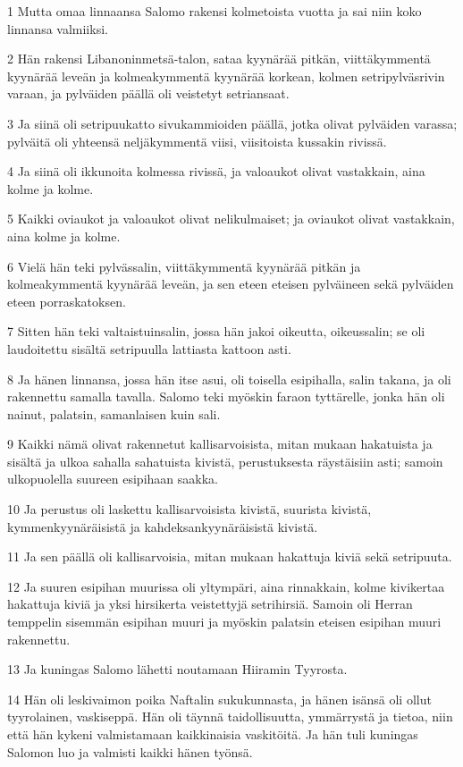 \par 1 Mutta omaa linnaansa Salomo rakensi kolmetoista vuotta ja sai niin koko linnansa valmiiksi.
\par 2 Hän rakensi Libanoninmetsä-talon, sataa kyynärää pitkän, viittäkymmentä kyynärää leveän ja kolmeakymmentä kyynärää korkean, kolmen setripylväsrivin varaan, ja pylväiden päällä oli veistetyt setriansaat.
\par 3 Ja siinä oli setripuukatto sivukammioiden päällä, jotka olivat pylväiden varassa; pylväitä oli yhteensä neljäkymmentä viisi, viisitoista kussakin rivissä.
\par 4 Ja siinä oli ikkunoita kolmessa rivissä, ja valoaukot olivat vastakkain, aina kolme ja kolme.
\par 5 Kaikki oviaukot ja valoaukot olivat nelikulmaiset; ja oviaukot olivat vastakkain, aina kolme ja kolme.
\par 6 Vielä hän teki pylvässalin, viittäkymmentä kyynärää pitkän ja kolmeakymmentä kyynärää leveän, ja sen eteen eteisen pylväineen sekä pylväiden eteen porraskatoksen.
\par 7 Sitten hän teki valtaistuinsalin, jossa hän jakoi oikeutta, oikeussalin; se oli laudoitettu sisältä setripuulla lattiasta kattoon asti.
\par 8 Ja hänen linnansa, jossa hän itse asui, oli toisella esipihalla, salin takana, ja oli rakennettu samalla tavalla. Salomo teki myöskin faraon tyttärelle, jonka hän oli nainut, palatsin, samanlaisen kuin sali.
\par 9 Kaikki nämä olivat rakennetut kallisarvoisista, mitan mukaan hakatuista ja sisältä ja ulkoa sahalla sahatuista kivistä, perustuksesta räystäisiin asti; samoin ulkopuolella suureen esipihaan saakka.
\par 10 Ja perustus oli laskettu kallisarvoisista kivistä, suurista kivistä, kymmenkyynäräisistä ja kahdeksankyynäräisistä kivistä.
\par 11 Ja sen päällä oli kallisarvoisia, mitan mukaan hakattuja kiviä sekä setripuuta.
\par 12 Ja suuren esipihan muurissa oli yltympäri, aina rinnakkain, kolme kivikertaa hakattuja kiviä ja yksi hirsikerta veistettyjä setrihirsiä. Samoin oli Herran temppelin sisemmän esipihan muuri ja myöskin palatsin eteisen esipihan muuri rakennettu.
\par 13 Ja kuningas Salomo lähetti noutamaan Hiiramin Tyyrosta.
\par 14 Hän oli leskivaimon poika Naftalin sukukunnasta, ja hänen isänsä oli ollut tyyrolainen, vaskiseppä. Hän oli täynnä taidollisuutta, ymmärrystä ja tietoa, niin että hän kykeni valmistamaan kaikkinaisia vaskitöitä. Ja hän tuli kuningas Salomon luo ja valmisti kaikki hänen työnsä.
